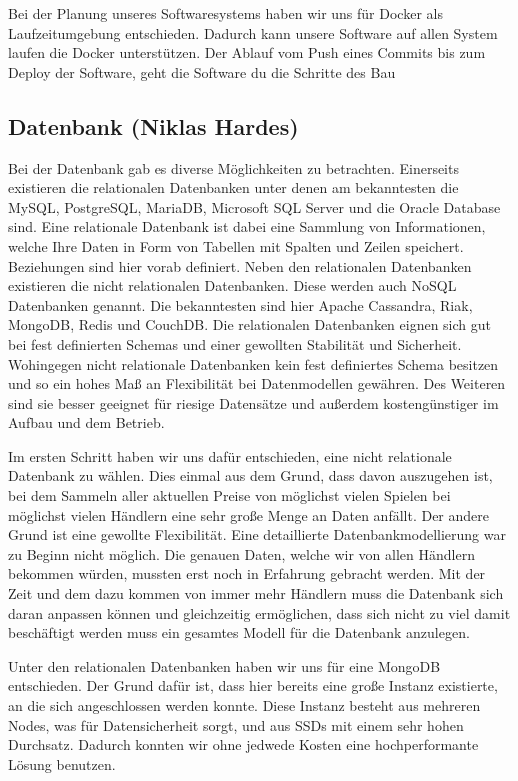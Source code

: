 Bei der Planung unseres Softwaresystems haben wir uns für Docker als Laufzeitumgebung entschieden. Dadurch kann unsere Software auf allen System laufen die Docker unterstützen. Der Ablauf vom Push eines Commits bis zum Deploy der Software, geht die Software du die Schritte des Bau


\subsection*{Datenbank (Niklas Hardes)}

Bei der Datenbank gab es diverse Möglichkeiten zu betrachten. Einerseits existieren die relationalen Datenbanken unter denen am bekanntesten die MySQL, PostgreSQL, MariaDB, Microsoft SQL Server und die Oracle Database sind. Eine relationale Datenbank ist dabei eine Sammlung von Informationen, welche Ihre Daten in Form von Tabellen mit Spalten und Zeilen speichert. Beziehungen sind hier vorab definiert. Neben den relationalen Datenbanken existieren die nicht relationalen Datenbanken. Diese werden auch NoSQL Datenbanken genannt. Die bekanntesten sind hier Apache Cassandra, Riak, MongoDB, Redis und CouchDB. Die relationalen Datenbanken eignen sich gut bei fest definierten Schemas und einer gewollten Stabilität und Sicherheit. Wohingegen nicht relationale Datenbanken kein fest definiertes Schema besitzen und so ein hohes Maß an Flexibilität bei Datenmodellen gewähren. Des Weiteren sind sie besser geeignet für riesige Datensätze und außerdem kostengünstiger im Aufbau und dem Betrieb. 

Im ersten Schritt haben wir uns dafür entschieden, eine nicht relationale Datenbank zu wählen. Dies einmal aus dem Grund, dass davon auszugehen ist, bei dem Sammeln aller aktuellen Preise von möglichst vielen Spielen bei möglichst vielen Händlern eine sehr große Menge an Daten anfällt. Der andere Grund ist eine gewollte Flexibilität. Eine detaillierte Datenbankmodellierung war zu Beginn nicht möglich. Die genauen Daten, welche wir von allen Händlern bekommen würden, mussten erst noch in Erfahrung gebracht werden. Mit der Zeit und dem dazu kommen von immer mehr Händlern muss die Datenbank sich daran anpassen können und gleichzeitig ermöglichen, dass sich nicht zu viel damit beschäftigt werden muss ein gesamtes Modell für die Datenbank anzulegen.

Unter den relationalen Datenbanken haben wir uns für eine MongoDB entschieden. Der Grund dafür ist, dass hier bereits eine große Instanz existierte, an die sich angeschlossen werden konnte. Diese Instanz besteht aus mehreren Nodes, was für Datensicherheit sorgt, und aus SSDs mit einem sehr hohen Durchsatz. Dadurch konnten wir ohne jedwede Kosten eine hochperformante Lösung benutzen.